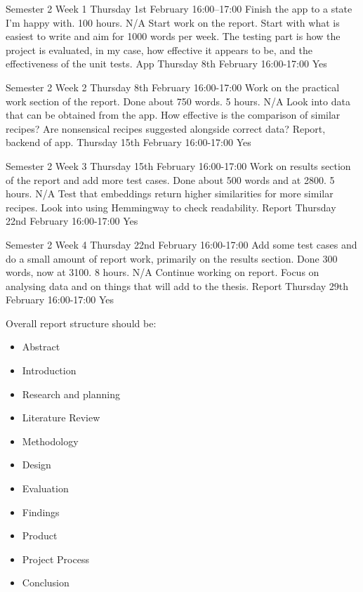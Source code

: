 \documentclass[../CHEFCookingHelper.tex]{subfiles}
\begin{document}
\logbookentry
{Semester 2 Week 1}
{Thursday 1st February 16:00--17:00}
{Finish the app to a state I'm happy with.}
{100 hours.}
{N/A}
{Start work on the report. Start with what is easiest to write and aim for 1000 words
per week. The testing part is how the project is evaluated, in my case, how effective
it appears to be, and the effectiveness of the unit tests.}
{App}
{Thursday 8th February 16:00-17:00}
{Yes}

\logbookentry
{Semester 2 Week 2}
{Thursday 8th February 16:00-17:00}
{Work on the practical work section of the report. Done about 750 words.}
{5 hours.}
{N/A}
{Look into data that can be obtained from the app. How effective is the
comparison of similar recipes? Are nonsensical recipes suggested alongside
correct data?}
{Report, backend of app.}
{Thursday 15th February 16:00-17:00}
{Yes}

\logbookentry
{Semester 2 Week 3}
{Thursday 15th February 16:00-17:00}
{Work on results section of the report and add more test cases. Done about 500 words and at 2800.}
{5 hours.}
{N/A}
{Test that embeddings return higher similarities for more similar recipes.
Look into using Hemmingway to check readability.}
{Report}
{Thursday 22nd February 16:00-17:00}
{Yes}

\logbookentry
{Semester 2 Week 4}
{Thursday 22nd February 16:00-17:00}
{Add some test cases and do a small amount of report work, primarily on the results
section. Done 300 words, now at 3100.}
{8 hours.}
{N/A}
{Continue working on report. Focus on analysing data and on things that will add to the thesis.}
{Report}
{Thursday 29th February 16:00-17:00}
{Yes}

Overall report structure should be:
\begin{itemize}
    \item Abstract
    \item Introduction
    \item Research and planning
    \item Literature Review
    \item Methodology
    \item Design
    \item Evaluation
    \item Findings
    \item Product
    \item Project Process
    \item Conclusion
\end{itemize}
\end{document}
